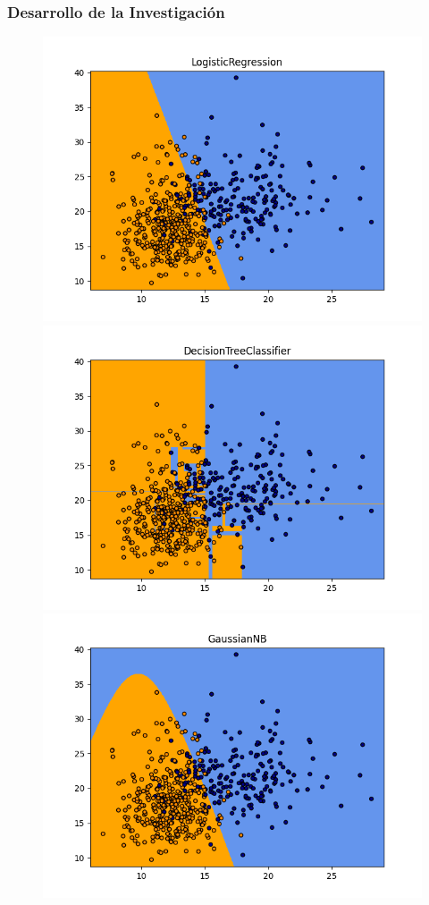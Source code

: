 \documentclass[xcolor=dvipsnames,xcolor=table]{beamer} %
\begin{document}
\begin{frame}
	\frametitle{Desarrollo de la Investigación}
	\begin{figure}[!htb]
		\includegraphics[width=1\linewidth]{PROYECTO/imgs/metodos/1_LogisticRegression}
		\endminipage\hfill
		\includegraphics[width=1\linewidth]{PROYECTO/imgs/metodos/2_DecisionTreeClassifier}
		\endminipage\hfill
		\includegraphics[width=1\linewidth]{PROYECTO/imgs/metodos/3_GaussianNB}

\end{figure}
\end{frame}
\end{document}

